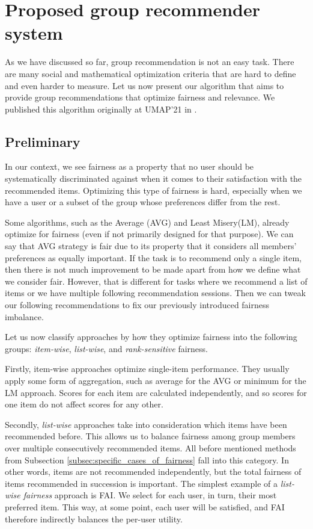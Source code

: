 \chapter{Proposed group recommender system}  \label{chap:our_work}

As we have discussed so far, group recommendation is not an easy task. There are many social and mathematical optimization criteria that are hard to define and even harder to measure. Let us now present our algorithm that aims to provide group recommendations that optimize fairness and relevance. We published this algorithm originally at UMAP'21 in \cite{our_ep_fuzz_da}.

\section{Preliminary}

In our context, we see fairness as a property that no user should be systematically discriminated against when it comes to their satisfaction with the recommended items. Optimizing this type of fairness is hard, especially when we have a user or a subset of the group whose preferences differ from the rest.

Some algorithms, such as the Average (AVG) and Least Misery(LM), already optimize for fairness (even if not primarily designed for that purpose). We can say that AVG strategy is fair due to its property that it considers all members' preferences as equally important. If the task is to recommend only a single item, then there is not much improvement to be made apart from how we define what we consider fair. However, that is different for tasks where we recommend a list of items or we have multiple following recommendation sessions. Then we can tweak our following recommendations to fix our previously introduced fairness imbalance.

Let us now classify approaches by how they optimize fairness into the following groups: \textit{item-wise}, \textit{list-wise}, and \textit{rank-sensitive} fairness.

Firstly, item-wise approaches optimize single-item performance. They usually apply some form of aggregation, such as average for the AVG or minimum for the LM approach. Scores for each item are calculated independently, and so scores for one item do not affect scores for any other.

Secondly, \textit{list-wise} approaches take into consideration which items have been recommended before. This allows us to balance fairness among group members over multiple consecutively recommended items. All before mentioned methods from Subsection \ref{subsec:specific_cases_of_fairness} fall into this category. In other words, items are not recommended independently, but the total fairness of items recommended in succession is important. The simplest example of a \textit{list-wise fairness} approach is FAI. We select for each user, in turn, their most preferred item. This way, at some point, each user will be satisfied, and FAI therefore indirectly balances the per-user utility.

